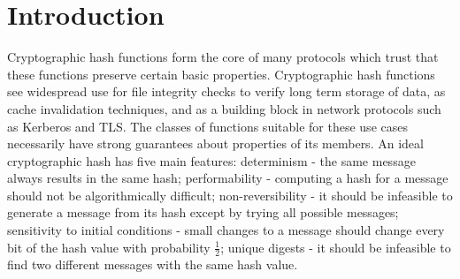 \documentclass[conference]{IEEEtran}
\begin{document}




\maketitle

\begin{abstract}
The discovery of fast collision attacks in cryptographic hash functions has
traditionally resulted in the immediate deprecation of that hash function.
In this paper we propose five scalable and practical metrics for evaluating
the utility of collision classes based on boolean constraints and show that
the published attacks by X. Wang, Y. Sasaki, P. Kasselman, H. Dobbertin, and
M. Schl{\"a}ffer in MD4 have high utility. We expand on existing attacks by
developing a series of techniques based on logical cryptanalysis to find
over 35,000 collisions in MD4 based on existing collisions, through the novel
definition of a collision neighborhood. We demonstrate new techniques for
inductively building full collisions from reduced round variants of MD4. We
propose these techniques as a mechanism for measuring hash trustworthiness and
discuss potential applications to real-world systems.
\end{abstract}

%
\IEEEpeerreviewmaketitle

\section{Introduction}

Cryptographic hash functions form the core of many protocols which
trust that these functions preserve certain basic
properties. Cryptographic hash functions see widespread
use for file integrity checks to verify long term storage of
data, as cache invalidation techniques, and as a building block in network
protocols such as Kerberos and TLS.  The classes of functions suitable
for these use cases necessarily have
strong guarantees about properties of its members.
An ideal cryptographic hash has five main features: determinism - the
same message always results in the same hash; performability -
computing a hash for a message should not be algorithmically
difficult; non-reversibility - it should be infeasible to generate a message
from its hash except by trying all possible messages; sensitivity to
initial conditions - small changes to a message should change every bit of
the hash value with probability $\frac{1}{2}$;
unique digests - it should be infeasible to find two different messages with
the same hash value.
\end{document}
